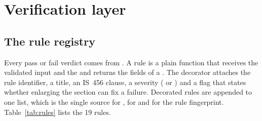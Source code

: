 \chapter{Verification layer}\label{ch:verify}

\section{The rule registry}
Every pass or fail verdict comes from . A rule is a plain function that receives the validated input and the  and returns the fields of a . The  decorator attaches the rule identifier, a title, an IS~456 clause, a severity ( or ) and a flag  that states whether enlarging the section can fix a failure. Decorated rules are appended to one list, which is the single source for , for  and for the rule fingerprint. Table~\ref{tab:rules} lists the 19 rules.

